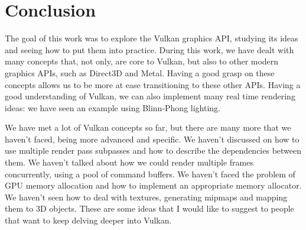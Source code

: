 \chapter*{Conclusion}

The goal of this work was to explore the Vulkan graphics API, studying
its ideas and seeing how to put them into practice.
During this work, we have dealt with many concepts that, not only, are core to
Vulkan, but also to other modern graphics APIs, such as Direct3D and Metal.
Having a good grasp on these concepts allows us to be more at ease
transitioning to these other APIs.
Having a good understanding of Vulkan, we can also implement many real
time rendering ideas: we have seen an example using Blinn-Phong lighting.

We have met a lot of Vulkan concepts so far, but there are many more
that we haven't faced, being more advanced and specific.
We haven't discussed on how to use multiple render pass subpasses and how
to describe the dependencies between them.
We haven't talked about how we could render multiple frames concurrently, using
a pool of command buffers.
We haven't faced the problem of GPU memory allocation and how to implement
an appropriate memory allocator.
We haven't seen how to deal with textures, generating mipmaps and mapping them
to 3D objects.
These are some ideas that I would like to suggest to people that want to
keep delving deeper into Vulkan.
